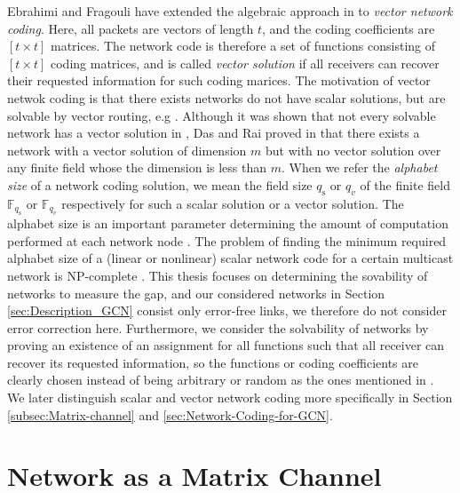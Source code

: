 Ebrahimi and Fragouli \cite{Ebrahimi:2011} have extended the algebraic
approach in \cite{Koetter:2003} to \textit{vector network coding}.
Here, all packets are vectors of length $t$, and the coding coefficients
are $\left[t\times t\right]$ matrices. The network code is therefore
a set of functions consisting of $\left[t\times t\right]$ coding
matrices, and is called \textit{vector solution} if all receivers
can recover their requested information for such coding marices. The
motivation of vector netwok coding is that there exists networks do
not have scalar solutions, but are solvable by vector routing, e.g
\cite{Medard:2003}. Although it was shown that not every solvable
network has a vector solution in \cite[Lemma II.2]{Dougherty:2005},
Das and Rai proved in \cite{Das:2016} that there exists a network
with a vector solution of dimension $m$ but with no vector solution
over any finite field whose the dimension is less than $m$. When
we refer the \textit{alphabet size} of a network coding solution,
we mean the field size $q_{\mathrm{s}}$ or $q_{v}$ of the finite
field $\ensuremath{\mathbb{F}}_{q_{\mathrm{s}}}$ or $\ensuremath{\mathbb{F}}_{q_{v}}$
respectively for such a scalar solution or a vector solution. The
alphabet size is an important parameter determining the amount of
computation performed at each network node \cite{Wachter-Zeh:2018}.
The problem of finding the minimum required alphabet size of a (linear
or nonlinear) scalar network code for a certain multicast network
is NP-complete \cite{Langberg:2009,Lehman:2004,Gone:2018}. This thesis
focuses on determining the sovability of networks to measure the gap,
and our considered networks in Section \ref{sec:Description_GCN}
consist only error-free links, we therefore do not consider error
correction here. Furthermore, we consider the solvability of networks
by proving an existence of an assignment for all functions such that
all receiver can recover its requested information, so the functions
or coding coefficients are clearly chosen instead of being arbitrary
or random as the ones mentioned in \cite{Ho:2003,Ahlswede:2000}.
We later distinguish scalar and vector network coding more specifically
in Section \ref{subsec:Matrix-channel} and \ref{sec:Network-Coding-for-GCN}.

\section{Network as a Matrix Channel \label{subsec:Matrix-channel}}

